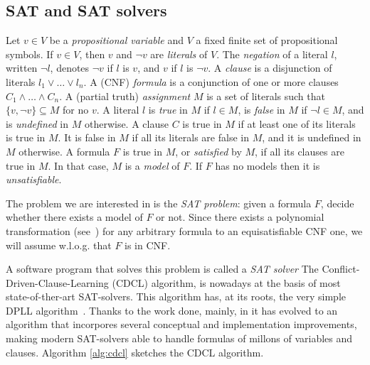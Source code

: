 \subsection{SAT and SAT solvers}

Let $v \in V $ be a \emph{propositional variable} and $V$
 a fixed finite set of propositional symbols.  If $v \in V$,
then $v$ and $\lnot v$ are \emph{literals} of $V$.  
The \emph{negation} of a literal $l$, written $\lnot l$, denotes 
$\lnot v$ if $l$ is $v$, and $v$ if $l$ is $\lnot v$.
A \emph{clause} is a disjunction of literals $l_1 \lor\ldots\lor l_n$.
A (CNF) \emph{formula} is a conjunction of one or
more clauses $C_1 \land\ldots\land C_n$. 
 A (partial truth) \emph{assignment} $M$ is a
set of literals such that $\{ v, \lnot v \} \subseteq M$ for no $v$. A
literal $l$ is \emph{true} in $M$ if $l \in M$, is \emph{false} in $M$
if $\lnot l \in M$, and is \emph{undefined} in $M$ otherwise. 
A clause $C$ is true in $M$ if at least one of its
literals is true in $M$.  It is false in $M$ if all its literals are
false in $M$, and it is undefined in $M$ otherwise. 
A formula $F$ is true in $M$, or
\emph{satisfied} by $M$, if all its clauses are
true in $M$.  In that case, $M$ is a \emph{model} of $F$.  If $F$ has
no models then it is \emph{unsatisfiable}.  

The problem we are interested in is the \emph{SAT problem}: given a
formula $F$, decide whether there exists a model of $F$ or not.
Since there exists a polynomial transformation
(see~\cite{Tseitin1968}) for any arbitrary formula to an
equisatisfiable CNF one, we will assume w.l.o.g. that $F$ is in CNF.

A software program that solves this problem is called a \emph{SAT
  solver} The Conflict-Driven-Clause-Learning (CDCL) algorithm, is
nowadays at the basis of most state-of-ther-art
SAT-solvers\cite{gluclose,plingeling,cryptominisat}.  This algorithm
has, at its roots, the very simple DPLL
algorithm~\cite{Davisetal1962CACM}. Thanks to the work done, mainly,
in
\cite{relsat,Chaff2001,GRASP1999IEEE,ZhangStickel1996AIMATH,EenSorensson2003SAT,picosat2008}
it has evolved to an algorithm that incorpores several conceptual and
implementation improvements, making modern SAT-solvers able to handle
formulas of millons of variables and clauses. Algorithm \ref{alg:cdcl}
sketches the CDCL algorithm.

